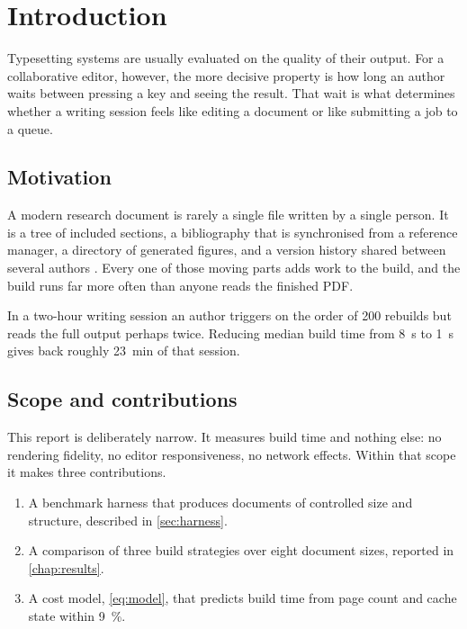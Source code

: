 \chapter{Introduction}
\label{chap:introduction}

Typesetting systems are usually evaluated on the quality of their
output. For a collaborative editor, however, the more decisive property
is how long an author waits between pressing a key and seeing the
result. That wait is what determines whether a writing session feels
like editing a document or like submitting a job to a queue.

\section{Motivation}

A modern research document is rarely a single file written by a single
person. It is a tree of included sections, a bibliography that is
synchronised from a reference manager, a directory of generated figures,
and a version history shared between several authors
\autocite{wilson2014best}. Every one of those moving parts adds work to
the build, and the build runs far more often than anyone reads the
finished PDF.

\begin{keybox}
In a two-hour writing session an author triggers on the order of
\num{200} rebuilds but reads the full output perhaps twice. Reducing
median build time from \qty{8}{\second} to \qty{1}{\second} gives back
roughly \qty{23}{\minute} of that session.
\end{keybox}

\section{Scope and contributions}

This report is deliberately narrow. It measures build time and nothing
else: no rendering fidelity, no editor responsiveness, no network
effects. Within that scope it makes three contributions.

\begin{enumerate}
  \item A benchmark harness that produces documents of controlled size
        and structure, described in \cref{sec:harness}.
  \item A comparison of three build strategies over eight document
        sizes, reported in \cref{chap:results}.
  \item A cost model, \cref{eq:model}, that predicts build time from
        page count and cache state within \qty{9}{\percent}.
\end{enumerate}

